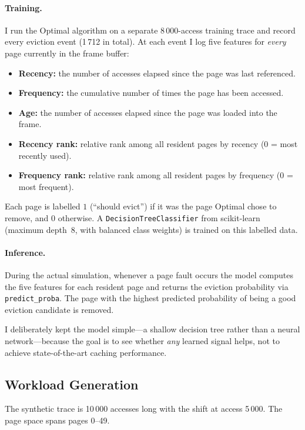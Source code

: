 \documentclass[11pt, a4paper]{article}
\begin{document}
\paragraph{Training.}
I run the Optimal algorithm on a separate 8\,000-access training trace and record every eviction event (1\,712 in total).
At each event I log five features for \emph{every} page currently in the frame buffer:
\begin{itemize}
    \item \textbf{Recency:} the number of accesses elapsed since the page was last referenced.
    \item \textbf{Frequency:} the cumulative number of times the page has been accessed.
    \item \textbf{Age:} the number of accesses elapsed since the page was loaded into the frame.
    \item \textbf{Recency rank:} relative rank among all resident pages by recency (0 = most recently used).
    \item \textbf{Frequency rank:} relative rank among all resident pages by frequency (0 = most frequent).
\end{itemize}
Each page is labelled $1$ (``should evict'') if it was the page Optimal chose to remove, and $0$ otherwise.
A \texttt{DecisionTreeClassifier} from scikit-learn (maximum depth~8, with balanced class weights) is trained on this labelled data.

\paragraph{Inference.}
During the actual simulation, whenever a page fault occurs the model computes the five features for each resident page and returns the eviction probability via \texttt{predict\_proba}.
The page with the highest predicted probability of being a good eviction candidate is removed.

I deliberately kept the model simple---a shallow decision tree rather than a neural network---because the goal is to see whether \emph{any} learned signal helps, not to achieve state-of-the-art caching performance.

\subsection{Workload Generation}

The synthetic trace is 10\,000 accesses long with the shift at access 5\,000.
The page space spans pages 0--49.
\end{document}

